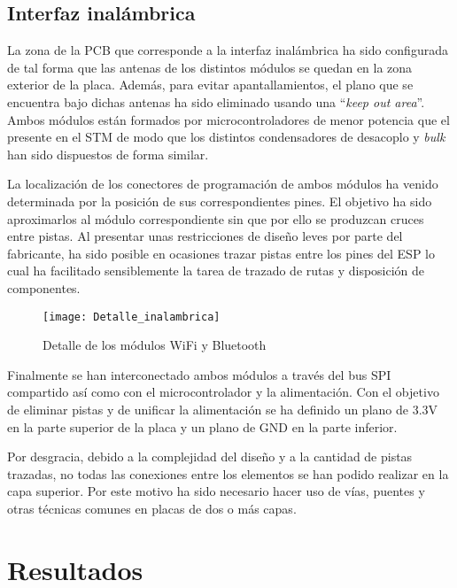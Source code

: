 \subsection{Interfaz inalámbrica\label{sec:PCB_inalambrica}}

La zona de la PCB que corresponde a la interfaz inalámbrica ha sido configurada de tal forma que las antenas de los distintos módulos se quedan en la zona exterior de la placa. Además, para evitar apantallamientos, el plano que se encuentra bajo dichas antenas ha sido eliminado usando una ``\textit{keep out area}''. Ambos módulos están formados por microcontroladores de menor potencia que el presente en el STM de modo que los distintos condensadores de desacoplo y \textit{bulk} han sido dispuestos de forma similar.

La localización de los conectores de programación de ambos módulos ha venido determinada por la posición de sus correspondientes pines. El objetivo ha sido aproximarlos al módulo correspondiente sin que por ello se produzcan cruces entre pistas. Al presentar unas restricciones de diseño leves por parte del fabricante, ha sido posible en ocasiones trazar pistas entre los pines del ESP lo cual ha facilitado sensiblemente la tarea de trazado de rutas y disposición de componentes.

\clearpage

\begin{figure} [h]
    \centering
    \texttt{[image: Detalle\_inalambrica]}
    \caption{Detalle de los módulos WiFi y Bluetooth}
    \label{fig:Detalle_inalambrica}
\end{figure}

Finalmente se han interconectado ambos módulos a través del bus SPI compartido así como con el microcontrolador y la alimentación. Con el objetivo de eliminar pistas y de unificar la alimentación se ha definido un plano de 3.3V en la parte superior de la placa y un plano de GND en la parte inferior. 

Por desgracia, debido a la complejidad del diseño y a la cantidad de pistas trazadas, no todas las conexiones entre los elementos se han podido realizar en la capa superior. Por este motivo ha sido necesario hacer uso de vías, puentes y otras técnicas comunes en placas de dos o más capas.

\clearpage

\section{Resultados\label{sec:PCB_Resultados}}

